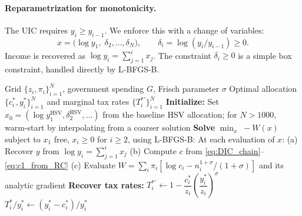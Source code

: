 \documentclass[12pt,a4paper]{article}
\theoremstyle{definition}
\theoremstyle{plain}
\theoremstyle{remark}
\begin{document}
\paragraph{Reparametrization for monotonicity.}
The UIC requires $y_i \geq y_{i-1}$.  We enforce this with a change of variables:
\[
  x = \bigl(\log y_1,\; \delta_2, \ldots, \delta_N\bigr), \qquad \delta_i = \log(y_i/y_{i-1}) \geq 0.
\]
Income is recovered as $\log y_i = \sum_{j=1}^{i} x_j$.  The constraint $\delta_i \geq 0$ is a simple box constraint, handled directly by L-BFGS-B\@.

\begin{algorithm}[H]
\caption{Mirrlees Approach}\label{alg:mirrlees}
\begin{algorithmic}[1]
\Require Grid $\{z_i, \pi_i\}_{i=1}^{N}$, government spending $G$, Frisch parameter $\sigma$
\Ensure Optimal allocation $\{c_i^*, y_i^*\}_{i=1}^{N}$ and marginal tax rates $\{T_i^{*\prime}\}_{i=1}^{N}$
\Statex
\State \textbf{Initialize:} Set $x_0 = (\log y_1^{\text{HSV}}, \delta_2^{\text{HSV}}, \ldots)$ from the baseline HSV allocation; for $N > 1000$, warm-start by interpolating from a coarser solution
\Statex
\State \textbf{Solve} $\min_{x}\; -W(x)$ subject to $x_1$ free, $x_i \geq 0$ for $i \geq 2$, using L-BFGS-B:
\Statex \hspace{\algorithmicindent} At each evaluation of $x$:
\Statex \hspace{\algorithmicindent}\hspace{\algorithmicindent} (a) Recover $y$ from $\log y_i = \sum_{j=1}^{i} x_j$
\Statex \hspace{\algorithmicindent}\hspace{\algorithmicindent} (b) Compute $c$ from \eqref{eq:DIC_chain}--\eqref{eq:c1_from_RC}
\Statex \hspace{\algorithmicindent}\hspace{\algorithmicindent} (c) Evaluate $W = \sum_i \pi_i[\log c_i - n_i^{1+\sigma}/(1+\sigma)]$ and its analytic gradient
\Statex
\State \textbf{Recover tax rates:}
  \State $T_i^{*\prime} \gets 1 - \dfrac{c_i^*}{z_i}\!\left(\dfrac{y_i^*}{z_i}\right)^{\!\sigma}$ 
  \State $T_i^*/y_i^* \gets (y_i^* - c_i^*)/y_i^*$ 
\EndFor
\end{algorithmic}
\end{algorithm}
\end{document}
